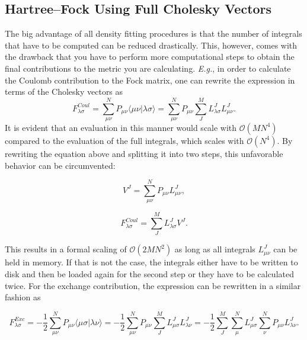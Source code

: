\subsection{Hartree--Fock Using Full Cholesky Vectors}

The big advantage of all density fitting procedures is that the number of integrals that have to be computed can be reduced drastically. This, however, comes with the drawback that you have to perform more computational steps to obtain the final contributions to the metric you are calculating. \textit{E.g.}, in order to calculate the Coulomb contribution to the Fock matrix, one can rewrite the expression in terms of the Cholesky vectors as
\begin{equation}
F^{Coul}_{\lambda\sigma} = \sum_{\mu\nu}^{N} P_{\mu\nu} \langle \mu \nu | \lambda \sigma \rangle = \sum_{\mu\nu}^{N} P_{\mu\nu} \sum_{J}^{M} L^J_{\lambda\sigma} L^J_{\mu\nu} .
\end{equation}
It is evident that an evaluation in this manner would scale with $\mathcal{O}(MN^4)$ compared to the evaluation of the full integrals, which scales with $\mathcal{O}(N^4)$. By rewriting the equation above and splitting it into two steps, this unfavorable behavior can be circumvented:

\begin{equation}
V^J = \sum_{\mu\nu}^{N} P_{\mu\nu} L^J_{\mu\nu} ,
\end{equation}

\begin{equation}
F^{Coul}_{\lambda\sigma} =  \sum_{J}^{M} L^J_{\lambda\sigma} V^J  .
\end{equation}

This results in a formal scaling of $\mathcal{O}(2MN^2)$ as long as all integrals $L^J_{\mu \nu}$ can be held in memory. If that is not the case, the integrals either have to be written to disk and then be loaded again for the second step or they have to be calculated twice. For the exchange contribution, the expression can be rewritten in a similar fashion as

\begin{equation}
F^{Exc}_{\lambda\sigma} = -\frac{1}{2} \sum_{\mu\nu}^{N} P_{\mu\nu} \langle \mu \sigma | \lambda \nu \rangle = -\frac{1}{2} \sum_{\mu \nu}^{N} P_{\mu\nu} \sum_{J}^{M} L^J_{\mu\sigma}  L^J_{\lambda\nu} = -\frac{1}{2} \sum_{J}^{M} \sum_{\mu}^{N} L^J_{\mu\sigma} \sum_{\nu}^{N} P_{\mu\nu} L^J_{\lambda\nu} .
\end{equation}

